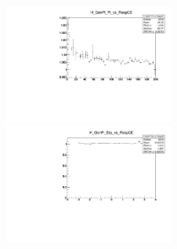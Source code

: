 \begin{figure}
\includegraphics[width=0.495\textwidth]{./plots_pdf/ECAL_plots/Prod6/NoPU/H_GenPi_Pt_vs_RespCE.pdf}
\includegraphics[width=0.495\textwidth]{./plots_pdf/ECAL_plots/Prod6/NoPU/H_GenPi_Eta_vs_RespCE.pdf}
\caption[NoPU HLT vs offline calibrated PF ECAL cluster]{}
\label{fig:NoPU_ECAL_Offline_vs_Online_CE}
\end{figure}                                                                                                                                                                       

